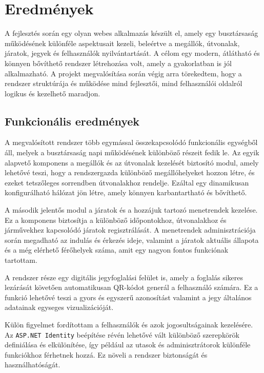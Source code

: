 \section{Eredmények}

A fejlesztés során egy olyan webes alkalmazás készült el, amely egy busztársaság működésének különféle aspektusait kezeli, beleértve a megállók, útvonalak, járatok, jegyek és felhasználók nyilvántartását. A célom egy modern, átlátható és könnyen bővíthető rendszer létrehozása volt, amely a gyakorlatban is jól alkalmazható. A projekt megvalósítása során végig arra törekedtem, hogy a rendszer struktúrája és működése mind fejlesztői, mind felhasználói oldalról logikus és kezelhető maradjon.

\subsection{Funkcionális eredmények}

A megvalósított rendszer több egymással összekapcsolódó funkcionális egységből áll, melyek a busztársaság napi működésének különböző részeit fedik le. Az egyik alapvető komponens a megállók és az útvonalak kezelését biztosító modul, amely lehetővé teszi, hogy a rendszergazda különböző megállóhelyeket hozzon létre, és ezeket tetszőleges sorrendben útvonalakhoz rendelje. Ezáltal egy dinamikusan konfigurálható hálózat jön létre, amely könnyen karbantartható és bővíthető.

A második jelentős modul a járatok és a hozzájuk tartozó menetrendek kezelése. Ez a komponens biztosítja a különböző időpontokhoz, útvonalakhoz és járművekhez kapcsolódó járatok regisztrálását. A menetrendek adminisztrációja során megadható az indulás és érkezés ideje, valamint a járatok aktuális állapota és a még elérhető férőhelyek száma, amit egy nagyon fontos funkciónak tartottam.

A rendszer része egy digitális jegyfoglalási felület is, amely a foglalás sikeres lezárását követően automatikusan QR-kódot generál a felhasználó számára. Ez a funkció lehetővé teszi a gyors és egyszerű azonosítást valamint a jegy általános adatainak egyseges vizualizációját.

Külön figyelmet fordítottam a felhasználók és azok jogosultságainak kezelésére. Az \texttt{ASP.NET Identity} beépítése révén lehetővé vált különböző szerepkörök definiálása és elkülönítése, így például az utasok és adminisztrátorok különféle funkciókhoz férhetnek hozzá. Ez növeli a rendszer biztonságát és használhatóságát.

